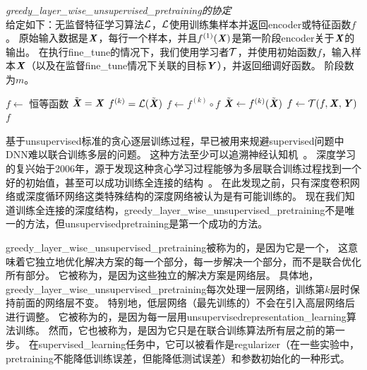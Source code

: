 \begin{algorithm}
\caption{ {\em \gls{greedy_layer_wise_unsupervised_pretraining}的协定}\\
给定如下：无监督特征学习算法$\mathcal{L}$，$\mathcal{L}$使用训练集样本并返回\gls{encoder}或特征函数$f$。
原始输入数据是$\boldsymbol{\mathit{X}}$，每行一个样本，并且$f^{(1)}(\boldsymbol{\mathit{X}})$是第一阶段\gls{encoder}关于$\boldsymbol{\mathit{X}}$的输出。
在执行\gls{fine_tune}的情况下，我们使用学习者$\mathcal{T}$，并使用初始函数$f$，输入样本$\boldsymbol{\mathit{X}}$（以及在监督\gls{fine_tune}情况下关联的目标$\boldsymbol{\mathit{Y}}$），并返回细调好函数。 阶段数为$m$。
}
\label{alg:pretraining}
\begin{algorithmic}
\STATE $f \leftarrow$ 恒等函数
\STATE $\tilde{\boldsymbol{\mathit{X}}} = \boldsymbol{\mathit{X}}$
  \STATE $f^{(k)} = {\mathcal{L}}(\tilde{\boldsymbol{\mathit{X}}})$
  \STATE $f \leftarrow f^{(k)} \circ f$
  \STATE $\tilde{\boldsymbol{\mathit{X}}} \leftarrow f^{(k)}(\tilde{\boldsymbol{\mathit{X}}})$
\ENDFOR
{}
  \STATE $f \leftarrow {\mathcal{T}}(f,\boldsymbol{\mathit{X}},\boldsymbol{\mathit{Y}})$
\ENDIF
{} $f$
\end{algorithmic}
\end{algorithm}


基于\gls{unsupervised}标准的贪心逐层训练过程，早已被用来规避\gls{supervised}问题中\gls{DNN}难以联合训练多层的问题。
这种方法至少可以追溯神经认知机~\citep{Fukushima75}。
深度学习的复兴始于2006年，源于发现这种贪心学习过程能够为多层联合训练过程找到一个好的初始值，甚至可以成功训练全连接的结构~\citep{Hinton06-small,Hinton-Science2006,HintonG2006,Bengio-nips-2006,ranzato-07-small}。
在此发现之前，只有深度卷积网络或深度循环网络这类特殊结构的深度网络被认为是有可能训练的。
现在我们知道训练全连接的深度结构，\gls{greedy_layer_wise_unsupervised_pretraining}不是唯一的方法，但\gls{unsupervised}\gls{pretraining}是第一个成功的方法。


\gls{greedy_layer_wise_unsupervised_pretraining}被称为的，是因为它是一个，
这意味着它独立地优化解决方案的每一个部分，每一步解决一个部分，而不是联合优化所有部分。
它被称为，是因为这些独立的解决方案是网络层。
具体地，\gls{greedy_layer_wise_unsupervised_pretraining}每次处理一层网络，训练第$k$层时保持前面的网络层不变。
特别地，低层网络（最先训练的）不会在引入高层网络后进行调整。
它被称为的，是因为每一层用\gls{unsupervised}\gls{representation_learning}算法训练。
然而，它也被称为，是因为它只是在联合训练算法所有层之前的第一步。
在\gls{supervised_learning}任务中，它可以被看作是\gls{regularizer}（在一些实验中，\gls{pretraining}不能降低训练误差，但能降低测试误差）和参数初始化的一种形式。

